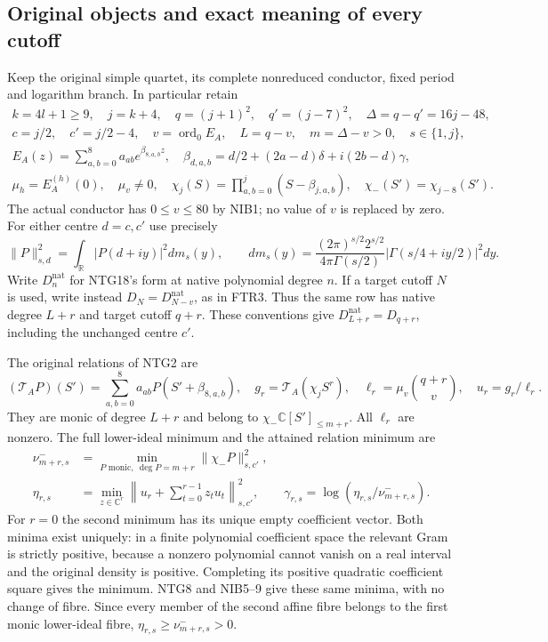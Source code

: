 \documentclass[11pt,a4paper]{article}
\begin{document}
\subsection{Original objects and exact meaning of every cutoff}
Keep the original simple quartet, its complete nonreduced conductor,
fixed period and logarithm branch.  In particular retain
\[
\begin{gathered}
 k=4l+1\ge9,\quad j=k+4,\quad q=(j+1)^2,\quad q'=(j-7)^2,
 \quad \Delta=q-q'=16j-48,\\
 c=j/2,\quad c'=j/2-4,\quad
 v=\operatorname{ord}_0E_A,\quad L=q-v,\quad m=\Delta-v>0,
 \quad s\in\{1,j\},\\
 E_A(z)=\sum_{a,b=0}^8a_{ab}e^{\beta_{8,a,b}z},\quad
 \beta_{d,a,b}=d/2+(2a-d)\delta+i(2b-d)\gamma,\\
 \mu_h=E_A^{(h)}(0),\quad \mu_v\ne0,\quad
 \chi_j(S)=\prod_{a,b=0}^j(S-\beta_{j,a,b}),\quad
 \chi_-(S')=\chi_{j-8}(S').
\end{gathered}\tag{ATA1}
\]
The actual conductor has $0\le v\le80$ by NIB1; no value of $v$
is replaced by zero.  For either centre $d=c,c'$ use precisely
\[
 \|P\|_{s,d}^2=\int_{\mathbb R}|P(d+iy)|^2dm_s(y),\qquad
 dm_s(y)=\frac{(2\pi)^{s/2}2^{s/2}}{4\pi\Gamma(s/2)}
             |\Gamma(s/4+iy/2)|^2dy.                 \tag{ATA2}
\]
Write $D^{\mathrm{nat}}_n$ for NTG18's form at native polynomial
degree $n$.  If a target cutoff $N$ is used, write instead
$D_N=D^{\mathrm{nat}}_{N-v}$, as in FTR3.  Thus the same row has
native degree $L+r$ and target cutoff $q+r$.  These conventions give
$D^{\mathrm{nat}}_{L+r}=D_{q+r}$, including the unchanged centre $c'$.

The original relations of NTG2 are
\[
 (\mathcal T_AP)(S')=\sum_{a,b=0}^8a_{ab}P(S'+\beta_{8,a,b}),
 \quad g_r=\mathcal T_A(\chi_jS^r),\quad
 \ell_r=\mu_v\binom{q+r}{v},\quad u_r=g_r/\ell_r.       \tag{ATA3}
\]
They are monic of degree $L+r$ and belong to
$\chi_-\mathbb C[S']_{\le m+r}$.  All $\ell_r$ are nonzero.
The full lower-ideal minimum and the attained relation minimum are
\[
\begin{aligned}
 \nu^-_{m+r,s}
 &=\min_{P\text{ monic},\ \deg P=m+r}\|\chi_-P\|_{s,c'}^2,\\
 \eta_{r,s}
 &=\min_{z\in\mathbb C^r}
       \left\|u_r+\sum_{t=0}^{r-1}z_tu_t\right\|_{s,c'}^2,
 \qquad \gamma_{r,s}=\log(\eta_{r,s}/\nu^-_{m+r,s}).
\end{aligned}\tag{ATA4}
\]
For $r=0$ the second minimum has its unique empty coefficient vector.
Both minima exist uniquely: in a finite polynomial coefficient space
the relevant Gram is strictly positive, because a nonzero polynomial
cannot vanish on a real interval and the original density is positive.
Completing its positive quadratic coefficient square gives the minimum.
NTG8 and NIB5--9 give these same minima, with no change of fibre.
Since every member of the second affine fibre belongs to the first
monic lower-ideal fibre, $\eta_{r,s}\ge\nu^-_{m+r,s}>0$.
\end{document}
